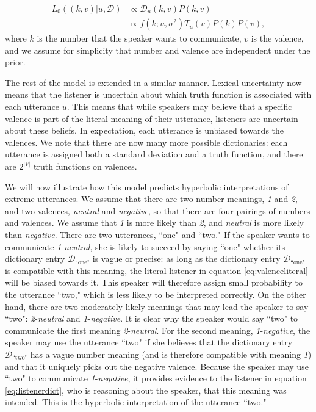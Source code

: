 \documentclass{article} %
\newcommand{\dictionary}{\ensuremath{\mathcal{D}}\xspace}
\begin{document}
\begin{align}\label{eq:valenceliteral}
L_0((k,v) | u, \dictionary) &\propto \dictionary_u(k,v)P(k,v) \\
&\propto f(k;u,\sigma^2)T_u(v)P(k)P(v),
\end{align}
where $k$ is the number that the speaker wants to communicate, $v$ is the valence, and we assume for simplicity that number and valence are independent under the prior. 

The rest of the model is extended in a similar manner. Lexical uncertainty now means that the listener is uncertain about which truth function is associated with each utterance $u$. This means that while speakers may believe that a specific valence is part of the literal meaning of their utterance, listeners are uncertain about these beliefs. In expectation, each utterance is unbiased towards the valences. We note that there are now many more possible dictionaries: each utterance is assigned both a standard deviation and a truth function, and there are $2^{|V|}$ truth functions on valences. 

We will now illustrate how this model predicts hyperbolic interpretations of extreme utterances. We assume that there are two number meanings, \emph{1} and \emph{2}, and two valences, \emph{neutral} and \emph{negative}, so that there are four pairings of numbers and valences. We assume that \emph{1} is more likely than \emph{2}, and \emph{neutral} is more likely than \emph{negative}. There are two utterances, ``one" and ``two." If the speaker wants to communicate \emph{1}-\emph{neutral}, she is likely to succeed by saying ``one" whether its dictionary entry $\dictionary_{\text{``one"}}$ is vague or precise: as long as the dictionary entry $\dictionary_{\text{``one"}}$ is compatible with this meaning, the literal listener in equation \ref{eq:valenceliteral} will be biased towards it. This speaker will therefore assign small probability to the utterance ``two," which is less likely to be interpreted correctly. On the other hand, there are two moderately likely meanings that may lead the speaker to say ``two": \emph{2}-\emph{neutral} and \emph{1}-\emph{negative}. It is clear why the speaker would say ``two" to communicate the first meaning \emph{2}-\emph{neutral}. For the second meaning, \emph{1}-\emph{negative}, the speaker may use the utterance ``two" if she believes that the dictionary entry  $\dictionary_{\text{``two"}}$ has a vague number meaning (and is therefore compatible with meaning \emph{1}) and that it uniquely picks out the negative valence. Because the speaker may use ``two" to communicate \emph{1}-\emph{negative}, it provides evidence to the listener in equation \ref{eq:listenerdict}, who is reasoning about the speaker, that this meaning was intended. This is the hyperbolic interpretation of the utterance ``two." 
\end{document}
